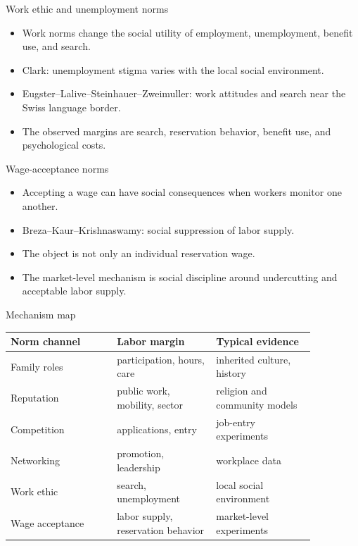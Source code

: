 \documentclass[aspectratio=169,11pt]{beamer}
\begin{document}
\begin{frame}{Work ethic and unemployment norms}
\begin{itemize}
    \item Work norms change the social utility of employment, unemployment, benefit use, and search.
    \item Clark: unemployment stigma varies with the local social environment.
    \item Eugster--Lalive--Steinhauer--Zweimuller: work attitudes and search near the Swiss language border.
    \item The observed margins are search, reservation behavior, benefit use, and psychological costs.
\end{itemize}
\end{frame}

\begin{frame}{Wage-acceptance norms}
\begin{itemize}
    \item Accepting a wage can have social consequences when workers monitor one another.
    \item Breza--Kaur--Krishnaswamy: social suppression of labor supply.
    \item The object is not only an individual reservation wage.
    \item The market-level mechanism is social discipline around undercutting and acceptable labor supply.
\end{itemize}
\end{frame}

\begin{frame}{Mechanism map}
\small
\begin{tabular}{p{0.30\linewidth} p{0.28\linewidth} p{0.28\linewidth}}
\toprule
Norm channel & Labor margin & Typical evidence \\
\midrule
Family roles & participation, hours, care & inherited culture, history \\
Reputation & public work, mobility, sector & religion and community models \\
Competition & applications, entry & job-entry experiments \\
Networking & promotion, leadership & workplace data \\
Work ethic & search, unemployment & local social environment \\
Wage acceptance & labor supply, reservation behavior & market-level experiments \\
\bottomrule
\end{tabular}
\end{frame}
\end{document}
